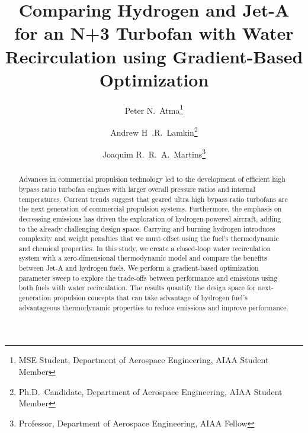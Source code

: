\documentclass[conf]{new-aiaa}
\title{Comparing Hydrogen and Jet-A for an N+3 Turbofan with Water Recirculation using Gradient-Based Optimization} %
\author{Peter N.~Atma\footnote{MSE Student, Department of Aerospace Engineering, AIAA Student Member}}
\author{Andrew H~.R.~Lamkin\footnote{Ph.D.~Candidate, Department of Aerospace Engineering, AIAA Student Member}}
\author{Joaquim R.~R.~A.~Martins\footnote{Professor, Department of Aerospace Engineering, AIAA Fellow}}
\affil{University of Michigan, Ann Arbor, MI, 48109}
\begin{document}
\maketitle

\begin{abstract}
  Advances in commercial propulsion technology led to the development of efficient high bypass ratio turbofan engines with larger overall pressure ratios and internal temperatures.
  Current trends suggest that geared ultra high bypass ratio turbofans are the next generation of commercial propulsion systems.
  Furthermore, the emphasis on decreasing emissions has driven the exploration of hydrogen-powered aircraft, adding to the already challenging design space.
  Carrying and burning hydrogen introduces complexity and weight penalties that we must offset using the fuel's thermodynamic and chemical properties.
  In this study, we create a closed-loop water recirculation system with a zero-dimensional thermodynamic model and compare the benefits between Jet-A and hydrogen fuels.
  We perform a gradient-based optimization parameter sweep to explore the trade-offs between performance and emissions using both fuels with water recirculation.
  The results quantify the design space for next-generation propulsion concepts that can take advantage of hydrogen fuel's advantageous thermodynamic properties to reduce emissions and improve performance.
\end{abstract}
\end{document}

